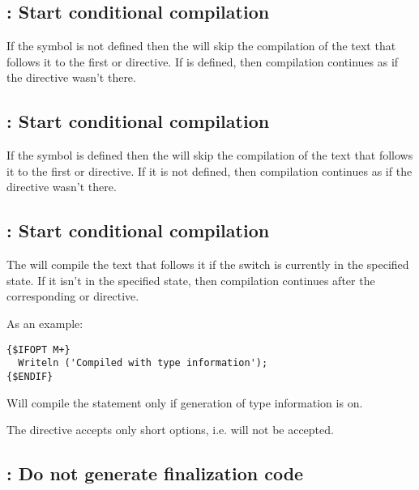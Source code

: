 \subsection{ : Start conditional compilation}

If the symbol  is not defined then the 
will skip the compilation of the text that follows it to the first
 or  directive.
If  is defined, then compilation continues as if the directive
wasn't there.

\subsection{ : Start conditional compilation}

If the symbol  is defined then the 
will skip the compilation of the text that follows it to the first
 or  directive.
If it is not defined, then compilation continues as if the directive
wasn't there.

\subsection{ : Start conditional compilation}

The  will compile the text that follows it if the
switch  is currently in the specified state.
If it isn't in the specified state, then compilation continues after the
corresponding  or  directive.

As an example:
\begin{verbatim}
{$IFOPT M+}
  Writeln ('Compiled with type information');
{$ENDIF}
\end{verbatim}
Will compile the  statement only if generation of type information is on.

\begin{remark}The  directive accepts only short options,
i.e.  will not be accepted.
\end{remark}

\subsection{ : Do not generate
finalization code}

